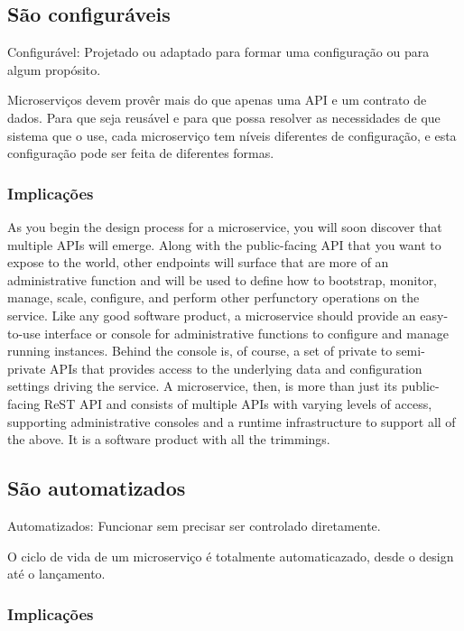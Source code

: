 \subsection{São configuráveis}

Configurável: Projetado ou adaptado para formar uma configuração ou para algum propósito.

Microserviços devem provêr mais do que apenas uma API e um contrato de dados. Para que seja reusável e para que possa resolver as necessidades de que sistema que o use, cada microserviço tem níveis diferentes de configuração, e esta configuração pode ser feita de diferentes formas.

\subsubsection*{Implicações}

As you begin the design process for a microservice, you will soon discover that multiple APIs will emerge. Along with the public-facing API that you want to expose to the world, other endpoints will surface that are more of an administrative function and will be used to define how to bootstrap, monitor, manage, scale, configure, and perform other perfunctory operations on the service. Like any good software product, a microservice should provide an easy-to-use interface or console for administrative functions to configure and manage running instances. Behind the console is, of course, a set of private to semi-private APIs that provides access to the underlying data and configuration settings driving the service. A microservice, then, is more than just its public-facing ReST API and consists of multiple APIs with varying levels of access, supporting administrative consoles and a runtime infrastructure to support all of the above. It is a software product with all the trimmings.

\subsection {São automatizados}

Automatizados: Funcionar sem precisar ser controlado diretamente.

O ciclo de vida de um microserviço é totalmente automaticazado, desde o design até o lançamento.

\subsubsection*{Implicações}

